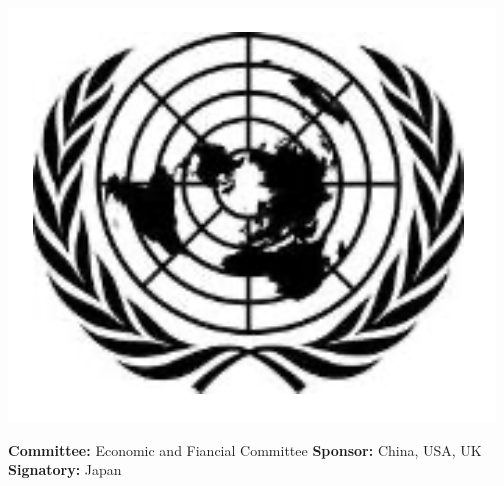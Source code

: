 \begin{flushright}
\includegraphics[scale=0.3]{mun-logo}\\
\end{flushright}
\newline
\setlength{\baselineskip}{16pt}
\textbf{Committee:}
Economic and Fiancial Committee
\newline
\textbf{Sponsor:}
China, USA, UK
\newline
\textbf{Signatory:}
Japan
\newline